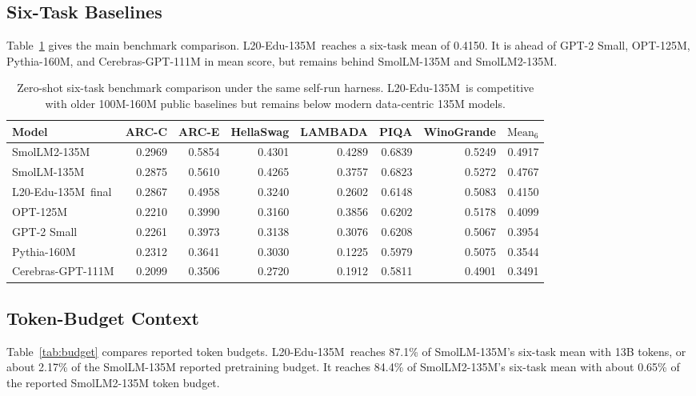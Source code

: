\documentclass[11pt]{article}
\newcommand{\model}{L20-Edu-135M}
\newcommand{\mean}{\mathrm{Mean}_6}
\begin{document}
\subsection{Six-Task Baselines}

Table~\ref{tab:benchmarks} gives the main benchmark comparison. \model\ reaches a six-task mean of 0.4150. It is ahead of GPT-2 Small, OPT-125M, Pythia-160M, and Cerebras-GPT-111M in mean score, but remains behind SmolLM-135M and SmolLM2-135M.

\begin{table}[h]
\centering
\scriptsize
\begin{tabular}{lrrrrrrr}
\toprule
Model & ARC-C & ARC-E & HellaSwag & LAMBADA & PIQA & WinoGrande & \(\mean\) \\
\midrule
SmolLM2-135M & 0.2969 & 0.5854 & 0.4301 & 0.4289 & 0.6839 & 0.5249 & 0.4917 \\
SmolLM-135M & 0.2875 & 0.5610 & 0.4265 & 0.3757 & 0.6823 & 0.5272 & 0.4767 \\
\model\ final & 0.2867 & 0.4958 & 0.3240 & 0.2602 & 0.6148 & 0.5083 & 0.4150 \\
OPT-125M & 0.2210 & 0.3990 & 0.3160 & 0.3856 & 0.6202 & 0.5178 & 0.4099 \\
GPT-2 Small & 0.2261 & 0.3973 & 0.3138 & 0.3076 & 0.6208 & 0.5067 & 0.3954 \\
Pythia-160M & 0.2312 & 0.3641 & 0.3030 & 0.1225 & 0.5979 & 0.5075 & 0.3544 \\
Cerebras-GPT-111M & 0.2099 & 0.3506 & 0.2720 & 0.1912 & 0.5811 & 0.4901 & 0.3491 \\
\bottomrule
\end{tabular}
\caption{Zero-shot six-task benchmark comparison under the same self-run harness. \model\ is competitive with older 100M-160M public baselines but remains below modern data-centric 135M models.}
\label{tab:benchmarks}
\end{table}

\subsection{Token-Budget Context}

Table~\ref{tab:budget} compares reported token budgets. \model\ reaches 87.1\% of SmolLM-135M's six-task mean with 13B tokens, or about 2.17\% of the SmolLM-135M reported pretraining budget. It reaches 84.4\% of SmolLM2-135M's six-task mean with about 0.65\% of the reported SmolLM2-135M token budget.
\end{document}
